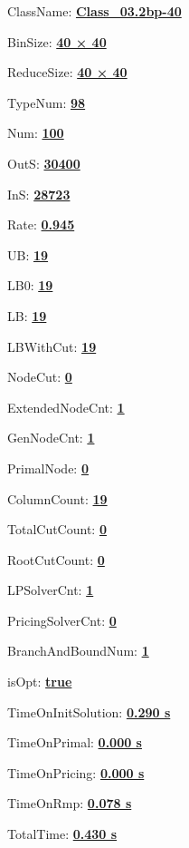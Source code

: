 \documentclass[11pt]{article}
\begin{document}
\pagestyle{empty}


ClassName: \underline{\textbf{Class_03.2bp-40}}
\par
BinSize: \underline{\textbf{40 × 40}}
\par
ReduceSize: \underline{\textbf{40 × 40}}
\par
TypeNum: \underline{\textbf{98}}
\par
Num: \underline{\textbf{100}}
\par
OutS: \underline{\textbf{30400}}
\par
InS: \underline{\textbf{28723}}
\par
Rate: \underline{\textbf{0.945}}
\par
UB: \underline{\textbf{19}}
\par
LB0: \underline{\textbf{19}}
\par
LB: \underline{\textbf{19}}
\par
LBWithCut: \underline{\textbf{19}}
\par
NodeCut: \underline{\textbf{0}}
\par
ExtendedNodeCnt: \underline{\textbf{1}}
\par
GenNodeCnt: \underline{\textbf{1}}
\par
PrimalNode: \underline{\textbf{0}}
\par
ColumnCount: \underline{\textbf{19}}
\par
TotalCutCount: \underline{\textbf{0}}
\par
RootCutCount: \underline{\textbf{0}}
\par
LPSolverCnt: \underline{\textbf{1}}
\par
PricingSolverCnt: \underline{\textbf{0}}
\par
BranchAndBoundNum: \underline{\textbf{1}}
\par
isOpt: \underline{\textbf{true}}
\par
TimeOnInitSolution: \underline{\textbf{0.290 s}}
\par
TimeOnPrimal: \underline{\textbf{0.000 s}}
\par
TimeOnPricing: \underline{\textbf{0.000 s}}
\par
TimeOnRmp: \underline{\textbf{0.078 s}}
\par
TotalTime: \underline{\textbf{0.430 s}}
\par
\newpage


\end{document}
